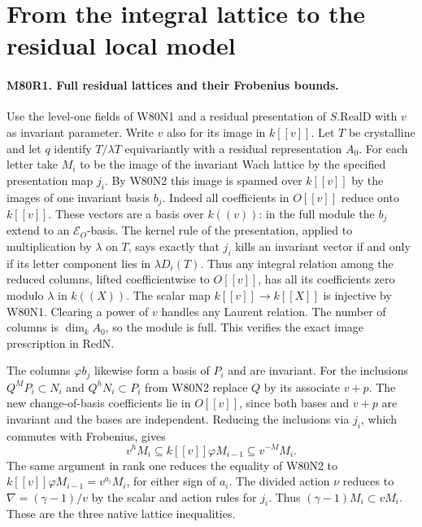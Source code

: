 \section{From the integral lattice to the residual local model}

\paragraph{M80R1. Full residual lattices and their Frobenius bounds.}
Use the level-one fields of W80N1 and a residual presentation of
$S.\mathrm{RealD}$ with $v$ as invariant parameter. Write $v$ also
for its image in $k[[v]]$. Let $T$ be crystalline and let $q$ identify
$T/\lambda T$ equivariantly with a residual representation $A_0$.
For each letter take $M_i$ to be the image of the invariant Wach
lattice by the specified presentation map $j_i$. By W80N2 this
image is spanned over $k[[v]]$ by the images of one invariant basis
$b_j$. Indeed all coefficients in $O[[v]]$ reduce onto $k[[v]]$.
These vectors are a basis over $k((v))$: in the full module the $b_j$
extend to an $\mathcal E_O$-basis. The kernel rule of the presentation,
applied to multiplication by $\lambda$ on $T$, says exactly that
$j_i$ kills an invariant vector if and only if its letter component
lies in $\lambda D_i(T)$. Thus any integral relation among the reduced
columns, lifted coefficientwise to $O[[v]]$, has all its coefficients
zero modulo $\lambda$ in $k((X))$. The scalar map $k[[v]]\to k[[X]]$
is injective by W80N1. Clearing a power of $v$ handles any Laurent
relation. The number of columns is $\dim_k A_0$, so the module is
full. This verifies the exact image prescription in $\mathrm{RedN}$.

The columns $\varphi b_j$ likewise form a basis of $P_i$ and are
invariant. For the inclusions $Q^{M}P_i\subset N_i$ and
$Q^hN_i\subset P_i$ from W80N2 replace $Q$ by its associate $v+p$.
The new change-of-basis coefficients lie in $O[[v]]$, since both
bases and $v+p$ are invariant and the bases are independent.
Reducing the inclusions via $j_i$, which commutes with Frobenius,
gives
\[
 v^h M_i\subseteq k[[v]]\varphi M_{i-1}\subseteq v^{-M}M_i.
\]
The same argument in rank one reduces the equality of W80N2 to
$k[[v]]\varphi M_{i-1}=v^{a_i}M_i$, for either sign of $a_i$.
The divided action $\nu$ reduces to $\nabla=(\gamma-1)/v$ by the
scalar and action rules for $j_i$. Thus $(\gamma-1)M_i\subset vM_i$.
These are the three native lattice inequalities.

